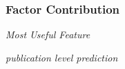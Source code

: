 \subsubsection{Factor Contribution}
{\it Most Useful Feature}

{\it publication level prediction}

































